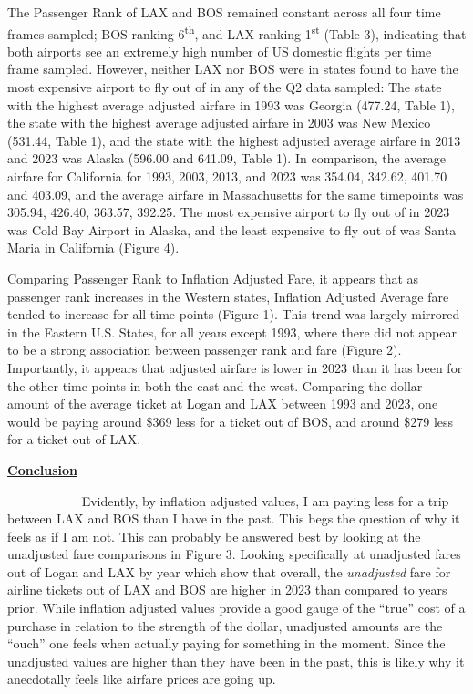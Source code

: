 \documentclass[
  letterpaper,
  DIV=11,
  numbers=noendperiod]{scrartcl}
\begin{document}
The Passenger Rank of LAX and BOS remained constant across all four time
frames sampled; BOS ranking 6\textsuperscript{th}, and LAX ranking
1\textsuperscript{st} (Table 3), indicating that both airports see an
extremely high number of US domestic flights per time frame sampled.
However, neither LAX nor BOS were in states found to have the most
expensive airport to fly out of in any of the Q2 data sampled: The state
with the highest average adjusted airfare in 1993 was Georgia (477.24,
Table 1), the state with the highest average adjusted airfare in 2003
was New Mexico (531.44, Table 1), and the state with the highest
adjusted average airfare in 2013 and 2023 was Alaska (596.00 and 641.09,
Table 1). In comparison, the average airfare for California for 1993,
2003, 2013, and 2023 was 354.04, 342.62, 401.70 and 403.09, and the
average airfare in Massachusetts for the same timepoints was 305.94,
426.40, 363.57, 392.25. The most expensive airport to fly out of in 2023
was Cold Bay Airport in Alaska, and the least expensive to fly out of
was Santa Maria in California (Figure 4).

Comparing Passenger Rank to Inflation Adjusted Fare, it appears that as
passenger rank increases in the Western states, Inflation Adjusted
Average fare tended to increase for all time points (Figure 1). This
trend was largely mirrored in the Eastern U.S. States, for all years
except 1993, where there did not appear to be a strong association
between passenger rank and fare (Figure 2). Importantly, it appears that
adjusted airfare is lower in 2023 than it has been for the other time
points in both the east and the west. Comparing the dollar amount of the
average ticket at Logan and LAX between 1993 and 2023, one would be
paying around \$369 less for a ticket out of BOS, and around \$279 less
for a ticket out of LAX.

\ul{\textbf{Conclusion}}

~~~~~~~~~~~ Evidently, by inflation adjusted values, I am paying less
for a trip between LAX and BOS than I have in the past. This begs the
question of why it feels as if I am not. This can probably be answered
best by looking at the unadjusted fare comparisons in Figure 3. Looking
specifically at unadjusted fares out of Logan and LAX by year which show
that overall, the \emph{unadjusted} fare for airline tickets out of LAX
and BOS are higher in 2023 than compared to years prior. While inflation
adjusted values provide a good gauge of the ``true'' cost of a purchase
in relation to the strength of the dollar, unadjusted amounts are the
``ouch'' one feels when actually paying for something in the moment.
Since the unadjusted values are higher than they have been in the past,
this is likely why it anecdotally feels like airfare prices are going
up.
\end{document}
